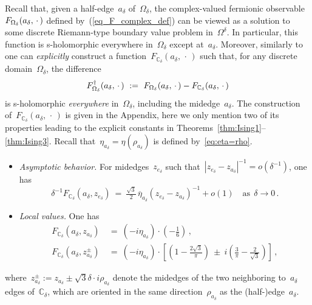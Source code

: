 \documentclass[reqno,11pt,a4paper]{amsart}
\theoremstyle{remark}
\newcommand{\C}{\mathbb{C}}
\begin{document}
Recall that, given a half-edge~$a_\delta$ of~$\Omega_\delta$, the complex-valued fermionic observable~$F_{\Omega_\delta}(a_\delta,\,\cdot\,)$ defined by~(\ref{eq_F_complex_def}) can be viewed as a solution to some discrete Riemann-type boundary value problem in~$\Omega^\delta$. In particular, this function is s-holomorphic everywhere in~$\Omega_\delta$ except at~$a_\delta$. Moreover, similarly to~\cite{HonSmi13} one can \emph{explicitly} construct a function~$F_{\C_\delta}(a_\delta,\,\cdot\,)$ such that,
for any discrete domain~$\Omega_\delta$, the difference
\begin{equation}
\label{eq:Fdag=}
\Fdelta^\dag(a_\delta,\,\cdot\,)~:=~\Fdelta(a_\delta,\,\cdot\,) - F_{\C_\delta}(a_\delta,\,\cdot\,)
\end{equation}
is s-holomorphic \emph{everywhere} in~$\Omega_\delta$, including the midedge~$a_\delta$.
The construction of~$F_{\C_\delta}(a_\delta,\,\cdot\,)$ is given in the Appendix, here
we only mention two of its properties leading to the explicit constants in Theorems~\mbox{\ref{thm:Ising1}--\ref{thm:Ising3}}. { Recall that~$\eta_{a_\delta}=\eta(\rho_{a_\delta})$ is defined by~\eqref{eq:eta=rho}.}
\begin{itemize}
\item \emph{Asymptotic behavior.} For midedges~$z_{e_\delta}$ such that~$|z_{e_\delta}-z_{a_\delta}|^{-1}=o(\delta^{-1})$, one has
\begin{equation}
\label{eq_full_plane_asymptotics}
\delta^{-1}F_{\C_\delta}(a_\delta,z_{e_\delta}) ~=~ \tfrac{\sqrt{3}}{2}\,{\overline{\eta}_{a_{\delta}}}{(z_{e_\delta}\!-z_{a_\delta})^{-1}}+o(1)\quad \text{as}\ \ \delta\to 0\,.
\end{equation}
\item \emph{Local values.} One has
\begin{align}
\label{eq_local_values_zero}
F_{\C_\delta}(a_\delta,z_{a_\delta})~& =~({-i\eta_{a_\delta}})\cdot (-{\textstyle\frac{1}{6}})\,, \\
\label{eq_local_values} F_{\C_\delta}(a_\delta,z_{a_\delta}^\pm)~& =~({-i\eta_{a_\delta}})\cdot [{\textstyle(1-\frac{2\sqrt{3}}{\pi})}~\pm~i(\textstyle\frac{3}{\pi}-\frac{2}{\sqrt{3}})]\,,
\end{align}
\end{itemize}
where~$z_{a_\delta}^\pm:=z_{a_\delta}\pm\sqrt{3}\delta\cdot i{\rho_{a_\delta}}$ denote the midedges of the two neighboring to~$a_\delta$ edges of~$\C_\delta$, which are oriented in the same direction~$\rho_{a_\delta}$ as the (half-)edge~$a_\delta$.
\end{document}
